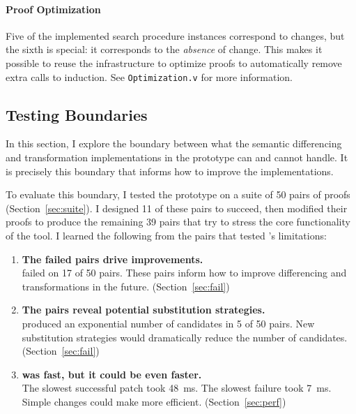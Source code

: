 
\paragraph{Proof Optimization}
Five of the implemented search procedure instances correspond to changes, but the sixth is special:
it corresponds to the \textit{absence} of change.
This makes it possible to reuse the \sysname infrastructure to optimize proofs
to automatically remove extra calls to induction.
See \lstinline{Optimization.v} for more information.

\subsection{Testing Boundaries}
\label{sec:bound-eval}

In this section, I explore the boundary between what the semantic differencing
and transformation implementations in the \sysname prototype can and cannot handle.
It is precisely this boundary that informs how to improve the implementations.

To evaluate this boundary, I tested the \sysname prototype on a suite of 50 pairs of proofs (Section~\ref{sec:suite}).
I designed 11 of these pairs to succeed, then modified their proofs to produce the remaining 39 pairs
that try to stress the core functionality of the tool.
I learned the following from the pairs
that tested \sysname's limitations:

\begin{enumerate}
\item \textbf{The failed pairs drive improvements.} \\
\sysname failed on 17 of 50 pairs. These pairs inform how to improve differencing and transformations in the future. (Section~\ref{sec:fail})
\item \textbf{The pairs reveal potential substitution strategies.} \\
\sysname produced an exponential number of candidates in 5 of 50 pairs.
New substitution strategies would dramatically reduce the number of candidates. (Section~\ref{sec:fail})
\item {} \textbf{was fast, but it could be even faster.} \\
The slowest successful patch took \SI{48}{\ms}. The slowest failure took \SI{7}{\ms}.
Simple changes could make \sysname more efficient. (Section~\ref{sec:perf})
\end{enumerate}

